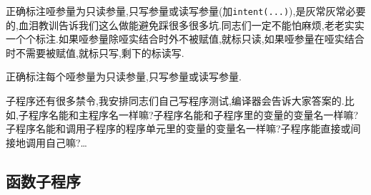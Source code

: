 正确标注哑参量为只读参量,只写参量或读写参量\label{arguments}(加\texttt{intent(...)}),是灰常灰常必要的,血泪教训告诉我们这么做能避免踩很多很多坑.同志们一定不能怕麻烦,老老实实一个个标注.如果哑参量除哑实结合时外不被赋值,就标只读,如果哑参量在哑实结合时不需要被赋值,就标只写,剩下的标读写.

\begin{convention}
    正确标注每个哑参量为只读参量,只写参量或读写参量.
\end{convention}

子程序还有很多禁令,我安排同志们自己写程序测试,编译器会告诉大家答案的.比如,子程序名能和主程序名一样嘛?子程序名能和子程序里的变量的变量名一样嘛?子程序名能和调用子程序的程序单元里的变量的变量名一样嘛?子程序能直接或间接地调用自己嘛?\dots

\subsection{函数子程序}

